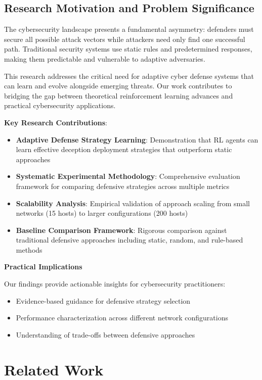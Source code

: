 \documentclass[12pt,oneside,a4paper]{article}
\theoremstyle{definition}
\theoremstyle{plain}
\begin{document}
\subsection{Research Motivation and Problem Significance}

The cybersecurity landscape presents a fundamental asymmetry: defenders must secure all possible attack vectors while attackers need only find one successful path. Traditional security systems use static rules and predetermined responses, making them predictable and vulnerable to adaptive adversaries.

This research addresses the critical need for adaptive cyber defense systems that can learn and evolve alongside emerging threats. Our work contributes to bridging the gap between theoretical reinforcement learning advances and practical cybersecurity applications.

\textbf{Key Research Contributions}:
\begin{itemize}
    \item \textbf{Adaptive Defense Strategy Learning}: Demonstration that RL agents can learn effective deception deployment strategies that outperform static approaches
    \item \textbf{Systematic Experimental Methodology}: Comprehensive evaluation framework for comparing defensive strategies across multiple metrics
    \item \textbf{Scalability Analysis}: Empirical validation of approach scaling from small networks (15 hosts) to larger configurations (200 hosts)
    \item \textbf{Baseline Comparison Framework}: Rigorous comparison against traditional defensive approaches including static, random, and rule-based methods
\end{itemize}

\textbf{Practical Implications}

Our findings provide actionable insights for cybersecurity practitioners:
\begin{itemize}
    \item Evidence-based guidance for defensive strategy selection
    \item Performance characterization across different network configurations
    \item Understanding of trade-offs between defensive approaches
\end{itemize}

\section{Related Work}
\end{document}

